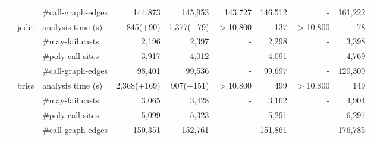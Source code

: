 \begin{table}[]
\begin{tabular}{@{}r|clrrrrrr@{}}
                                   &                           & \#call-graph-edges   & 144,873                  & 145,953                    & 143,727                           & 146,512                         & -                         & 161,222                     \\\cmidrule(){2-9}
                                   & \multirow{4}{*}{jedit}    & analysis time (s)    & 845(+90)                      & 1,377(+79)                      &   $>$10,800                         & 137                         & $>$10,800      & 78                         \\
                                   &                           & \#may-fail casts     & 2,196                    & 2,397                      &  -                          & 2,298                         &  -                        & 3,398                      \\
                                   &                           & \#poly-call sites    & 3,917                    & 4,012                      &  -                          & 4,091                         &  -                        & 4,769                      \\
                                   &                           & \#call-graph-edges   & 98,401                   & 99,536                     &  -                          & 99,697                         &  -                        & 120,309                     \\\cmidrule(){2-9}
                                   & \multirow{4}{*}{briss}    & analysis time (s)    & 2,368(+169)                    & 907(+151)                           & $>$10,800                           & 499                         & $>$10,800     & 149                        \\
                                   &                           & \#may-fail casts     & 3,065                    & 3,428                      &  -                          & 3,162                         &  -                        & 4,904                      \\
                                   &                           & \#poly-call sites    & 5,099                    & 5,323                      &  -                          & 5,291                         &  -                        & 6,297                      \\
                                   &                           & \#call-graph-edges   & 150,351                  & 152,761                    &  -                          & 151,861                         &  -                        & 176,785                     \\\cmidrule(){2-9}

\end{tabular}
\end{table}
